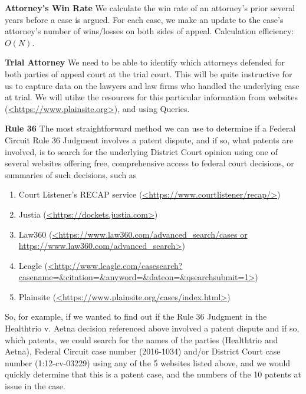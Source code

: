 \documentclass{article} %
\begin{document}
\textbf{Attorney's Win Rate}
We calculate the win rate of an attorney's prior several years before a case is argued. For each case, we make an update to the case's attorney's number of wins/losses on both sides of appeal. Calculation efficiency: $O(N)$.

\textbf{Trial Attorney}
We need to be able to identify which attorneys defended for both parties of appeal court at the trial court. This will be quite instructive for us to capture data on the lawyers and law firms who handled the underlying case at trial. We will utilze the resources for this particular information from websites (\url{<https://www.plainsite.org>}), and using Queries.

\textbf{Rule 36}
The most straightforward method we can use to determine if a Federal Circuit Rule 36 Judgment involves a patent dispute, and if so, what patents are involved, is to search for the underlying District Court opinion using one of several websites offering free, comprehensive access to federal court decisions, or summaries of such decisions, such as 
\begin{enumerate}
\item Court Listener's RECAP service (\url{<https://www.courtlistener/recap/>})
\item Justia (\url{<https://dockets.justia.com>})
\item Law360 (\url{<https://www.law360.com/advanced_search/cases or https://www.law360.com/advanced_search>})
\item Leagle (\url{<http://www.leagle.com/casesearch?casename=&citation=&anyword=&dateon=&qsearchsubmit=1>})
\item Plainsite (\url{<https://www.plainsite.org/cases/index.html>})
\end{enumerate}
 So, for example, if we wanted to find out if the Rule 36 Judgment in the Healthtrio v. Aetna decision referenced above involved a patent dispute and if so, which patents, we could search for the names of the parties (Healthtrio and Aetna), Federal Circuit case number (2016-1034) and/or District Court case number (1:12-cv-03229) using any of the 5 websites listed above, and we would quickly determine that this is a patent case, and the numbers of the 10 patents at issue in the case.
\end{document}
